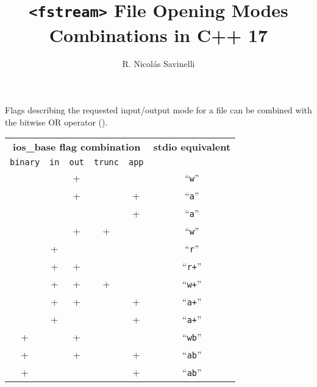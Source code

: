 \documentclass[letter]{article}
\title{\bf{\texttt{{\textless}fstream{\textgreater}} File Opening Modes
Combinations in C++ 17}}
\author{R. Nicolás Savinelli}
\begin{document}
\maketitle{}

\noindent
Flags describing the requested input/output mode for a file can be combined with the bitwise OR operator (\textbar). \\

\begin{table}[!h]
\centering
\begin{tabular}{|cccccc|}
\hline
\multicolumn{5}{|c}{\bf{ios\_base flag combination}} & \multicolumn{1}{l|}{\bf{stdio equivalent}} \\
\texttt{binary} & \texttt{in} & \texttt{out} & \texttt{trunc} & \texttt{app} & \multicolumn{1}{l|}{} \\ \hline
           &        & +      &          &        & ``\texttt{w}''                                   \\ \hline
           &        & +      &          & +      & ``\texttt{a}''                                   \\ \hline
           &        &        &          & +      & ``\texttt{a}''                                   \\ \hline
           &        & +      & +        &        & ``\texttt{w}''                                   \\ \hline
           & +      &        &          &        & ``\texttt{r}''                                   \\ \hline
           & +      & +      &          &        & ``\texttt{r+}''                                  \\ \hline
           & +      & +      & +        &        & ``\texttt{w+}''                                  \\ \hline
           & +      & +      &          & +      & ``\texttt{a+}''                                  \\ \hline
           & +      &        &          & +      & ``\texttt{a+}''                                  \\ \hline
+          &        & +      &          &        & ``\texttt{wb}''                                  \\ \hline
+          &        & +      &          & +      & ``\texttt{ab}''                                  \\ \hline
+          &        &        &          & +      & ``\texttt{ab}''                                  \\ \hline

\end{tabular}
\end{table}
\end{document}
